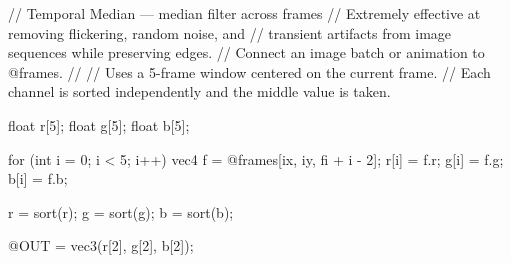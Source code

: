 // Temporal Median — median filter across frames
// Extremely effective at removing flickering, random noise, and
// transient artifacts from image sequences while preserving edges.
// Connect an image batch or animation to @frames.
//
// Uses a 5-frame window centered on the current frame.
// Each channel is sorted independently and the middle value is taken.

float r[5];
float g[5];
float b[5];

for (int i = 0; i < 5; i++) {
    vec4 f = @frames[ix, iy, fi + i - 2];
    r[i] = f.r;
    g[i] = f.g;
    b[i] = f.b;
}

r = sort(r);
g = sort(g);
b = sort(b);

@OUT = vec3(r[2], g[2], b[2]);
